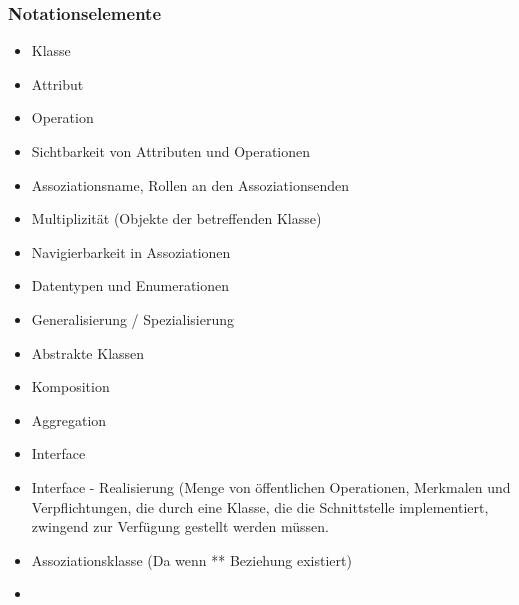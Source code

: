 \documentclass[../ZF_SWEN1.tex]{subfiles}
\begin{document}
\subsubsection{Notationselemente}
\begin{itemize}
	\item Klasse
	\item Attribut
	\item Operation
	\item Sichtbarkeit von Attributen und Operationen
	\item Assoziationsname, Rollen an den Assoziationsenden
	\item Multiplizität (Objekte der betreffenden Klasse)
	\item Navigierbarkeit in Assoziationen
	\item Datentypen und Enumerationen
	\item Generalisierung / Spezialisierung
	\item Abstrakte Klassen
	\item Komposition
	\item Aggregation
	\item Interface
	\item Interface - Realisierung (Menge von öffentlichen Operationen, Merkmalen und Verpflichtungen, die durch eine Klasse, die die Schnittstelle implementiert, zwingend zur Verfügung gestellt werden müssen.
	\item Assoziationsklasse (Da wenn ** Beziehung existiert)
	\item 
\end{itemize}
\end{document}
